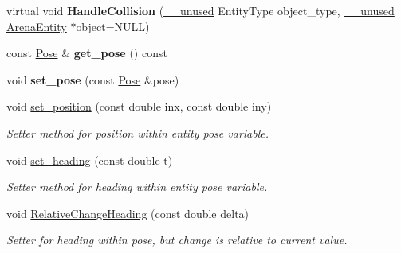 \begin{DoxyCompactItemize}
\mbox{\label{class_arena_entity_ab2542a4ed254128e4140333ce5e0b473}} 
virtual void {\bfseries Handle\+Collision} (\mbox{\hyperlink{common_8h_a2e3484535ee610c8e19e9859563abe48}{\+\_\+\+\_\+unused}} Entity\+Type object\+\_\+type, \mbox{\hyperlink{common_8h_a2e3484535ee610c8e19e9859563abe48}{\+\_\+\+\_\+unused}} \mbox{\hyperlink{class_arena_entity}{Arena\+Entity}} $\ast$object=N\+U\+LL)
\item 
\mbox{\label{class_arena_entity_a9a0efa995da3ed55e92f54357fd2bdae}} 
const \mbox{\hyperlink{struct_pose}{Pose}} \& {\bfseries get\+\_\+pose} () const
\item 
\mbox{\label{class_arena_entity_a6eb76e5f1b5949314c12cc512d6930ae}} 
void {\bfseries set\+\_\+pose} (const \mbox{\hyperlink{struct_pose}{Pose}} \&pose)
\item 
\mbox{\label{class_arena_entity_a3136704edf07c24639319abf5c28dac0}} 
void \mbox{\hyperlink{class_arena_entity_a3136704edf07c24639319abf5c28dac0}{set\+\_\+position}} (const double inx, const double iny)
\begin{DoxyCompactList}\small\item\em Setter method for position within entity pose variable. \end{DoxyCompactList}\item 
\mbox{\label{class_arena_entity_ac1cc3c6997bc7a9573128fc5ded9eb72}} 
void \mbox{\hyperlink{class_arena_entity_ac1cc3c6997bc7a9573128fc5ded9eb72}{set\+\_\+heading}} (const double t)
\begin{DoxyCompactList}\small\item\em Setter method for heading within entity pose variable. \end{DoxyCompactList}\item 
void \mbox{\hyperlink{class_arena_entity_a4c4bd7f5ffb778979303c33cb3bc9986}{Relative\+Change\+Heading}} (const double delta)
\begin{DoxyCompactList}\small\item\em Setter for heading within pose, but change is relative to current value. \end{DoxyCompactList}\item 
\mbox{\label{class_arena_entity_a5790a5d45229aa76223a8183ac916323}} 

\end{DoxyCompactItemize}
